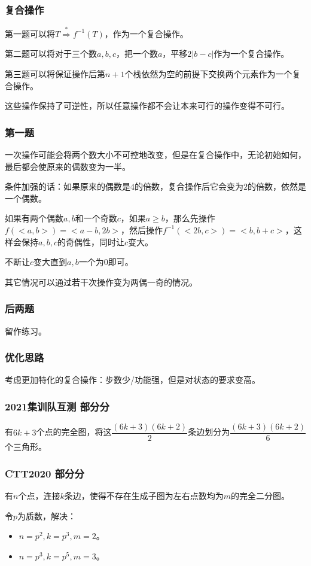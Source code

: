 \documentclass[10pt]{beamer}
\begin{document}
	\clearpage
	\begin{frame}
		\frametitle{复合操作}
	
		第一题可以将$T\stackrel*\Rightarrow f^{-1}(T)$，作为一个复合操作。

		第二题可以将对于三个数$a,b,c$，把一个数$a$，平移$2|b-c|$作为一个复合操作。

		第三题可以将保证操作后第$n+1$个栈依然为空的前提下交换两个元素作为一个复合操作。

		这些操作保持了可逆性，所以任意操作都不会让本来可行的操作变得不可行。
	
	\end{frame}
	\clearpage
	\begin{frame}
		\frametitle{第一题}
	
		一次操作可能会将两个数大小不可控地改变，但是在复合操作中，无论初始如何，最后都会使原来的偶数变为一半。

		条件加强的话：如果原来的偶数是$4$的倍数，复合操作后它会变为$2$的倍数，依然是一个偶数。

		如果有两个偶数$a,b$和一个奇数$c$，如果$a\ge b$，那么先操作$f(<a,b>)=<a-b,2b>$，然后操作$f^{-1}(<2b,c>)=<b,b+c>$，这样会保持$a,b,c$的奇偶性，同时让$c$变大。

		不断让$c$变大直到$a,b$一个为$0$即可。

		其它情况可以通过若干次操作变为两偶一奇的情况。
	
	\end{frame}
	\clearpage
	\begin{frame}
		\frametitle{后两题}
	
		留作练习。
	
	\end{frame}
	\clearpage
	\begin{frame}
		\frametitle{优化思路}
	
		考虑更加特化的复合操作：步数少/功能强，但是对状态的要求变高。
	
	\end{frame}
	\clearpage
	\begin{frame}
		\frametitle{2021集训队互测 部分分}
	
		有$6k+3$个点的完全图，将这$\dfrac{(6k+3)(6k+2)}{2}$条边划分为$\dfrac{(6k+3)(6k+2)}{6}$个三角形。
	
	\end{frame}
	\clearpage
	\begin{frame}
		\frametitle{CTT2020 部分分}
	
		有$n$个点，连接$k$条边，使得不存在生成子图为左右点数均为$m$的完全二分图。

		令$p$为质数，解决：

		\begin{itemize}
			\item $n=p^2,k=p^3,m=2$。
			\item $n=p^3,k=p^5,m=3$。
		\end{itemize}
	
	\end{frame}
\end{document}
